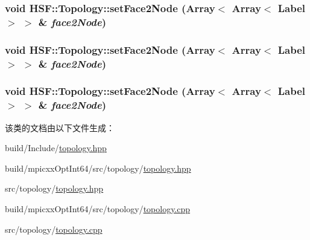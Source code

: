 \label{classHSF_1_1Topology_a61f5c30ee928367a573f8b4b139ecd8f}
\hypertarget{classHSF_1_1Topology_ad5dc6fbfb70d53bc41c616b747f5b9a4}{
\subsubsection[{setFace2Node}]{\setlength{\rightskip}{0pt plus 5cm}void HSF::Topology::setFace2Node (Array$<$ Array$<$ {\bf Label} $>$ $>$ \& {\em face2Node})}}
\label{classHSF_1_1Topology_ad5dc6fbfb70d53bc41c616b747f5b9a4}
\hypertarget{classHSF_1_1Topology_ad5dc6fbfb70d53bc41c616b747f5b9a4}{
\subsubsection[{setFace2Node}]{\setlength{\rightskip}{0pt plus 5cm}void HSF::Topology::setFace2Node (Array$<$ Array$<$ {\bf Label} $>$ $>$ \& {\em face2Node})}}
\label{classHSF_1_1Topology_ad5dc6fbfb70d53bc41c616b747f5b9a4}
\hypertarget{classHSF_1_1Topology_ad5dc6fbfb70d53bc41c616b747f5b9a4}{
\subsubsection[{setFace2Node}]{\setlength{\rightskip}{0pt plus 5cm}void HSF::Topology::setFace2Node (Array$<$ Array$<$ {\bf Label} $>$ $>$ \& {\em face2Node})}}
\label{classHSF_1_1Topology_ad5dc6fbfb70d53bc41c616b747f5b9a4}


该类的文档由以下文件生成：\begin{DoxyCompactItemize}
\item 
build/Include/\hyperlink{build_2Include_2topology_8hpp}{topology.hpp}\item 
build/mpicxxOptInt64/src/topology/\hyperlink{build_2mpicxxOptInt64_2src_2topology_2topology_8hpp}{topology.hpp}\item 
src/topology/\hyperlink{src_2topology_2topology_8hpp}{topology.hpp}\item 
build/mpicxxOptInt64/src/topology/\hyperlink{build_2mpicxxOptInt64_2src_2topology_2topology_8cpp}{topology.cpp}\item 
src/topology/\hyperlink{src_2topology_2topology_8cpp}{topology.cpp}\end{DoxyCompactItemize}
